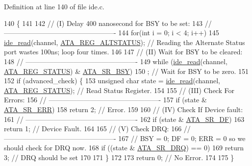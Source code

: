 Definition at line 140 of file ide.\+c.


\begin{DoxyCode}
140                                                                               \{
141     
142     \textcolor{comment}{// (I) Delay 400 nanosecond for BSY to be set:}
143     \textcolor{comment}{// -------------------------------------------------}
144     \textcolor{keywordflow}{for}(\textcolor{keywordtype}{int} i = 0; i < 4; i++)
145         \hyperlink{a00032_aef734da4bdc0c1d014528fd2f66e0686_aef734da4bdc0c1d014528fd2f66e0686}{ide\_read}(channel, \hyperlink{a00032_a051769d4520d201d24bbb06758a5c1de_a051769d4520d201d24bbb06758a5c1de}{ATA\_REG\_ALTSTATUS}); \textcolor{comment}{// Reading the Alternate Status port
       wastes 100ns; loop four times.}
146     
147     \textcolor{comment}{// (II) Wait for BSY to be cleared:}
148     \textcolor{comment}{// -------------------------------------------------}
149     \textcolor{keywordflow}{while} (\hyperlink{a00032_aef734da4bdc0c1d014528fd2f66e0686_aef734da4bdc0c1d014528fd2f66e0686}{ide\_read}(channel, \hyperlink{a00032_a3b532ef33b38be16a240f8f2e21bc5db_a3b532ef33b38be16a240f8f2e21bc5db}{ATA\_REG\_STATUS}) & \hyperlink{a00032_aed1929007f388cab23229c908be5bbaf_aed1929007f388cab23229c908be5bbaf}{ATA\_SR\_BSY})
150         ; \textcolor{comment}{// Wait for BSY to be zero.}
151     
152     \textcolor{keywordflow}{if} (advanced\_check) \{
153         \textcolor{keywordtype}{unsigned} \textcolor{keywordtype}{char} state = \hyperlink{a00032_aef734da4bdc0c1d014528fd2f66e0686_aef734da4bdc0c1d014528fd2f66e0686}{ide\_read}(channel, \hyperlink{a00032_a3b532ef33b38be16a240f8f2e21bc5db_a3b532ef33b38be16a240f8f2e21bc5db}{ATA\_REG\_STATUS}); \textcolor{comment}{// Read Status
       Register.}
154     
155         \textcolor{comment}{// (III) Check For Errors:}
156         \textcolor{comment}{// -------------------------------------------------}
157         \textcolor{keywordflow}{if} (state & \hyperlink{a00032_a8a2cf843df1ae63d4d16748dfe72a592_a8a2cf843df1ae63d4d16748dfe72a592}{ATA\_SR\_ERR})
158             \textcolor{keywordflow}{return} 2; \textcolor{comment}{// Error.}
159     
160         \textcolor{comment}{// (IV) Check If Device fault:}
161         \textcolor{comment}{// -------------------------------------------------}
162         \textcolor{keywordflow}{if} (state & \hyperlink{a00032_aca73201ed93e5c9d9d9fbf51270fde0b_aca73201ed93e5c9d9d9fbf51270fde0b}{ATA\_SR\_DF})
163             \textcolor{keywordflow}{return} 1; \textcolor{comment}{// Device Fault.}
164     
165         \textcolor{comment}{// (V) Check DRQ:}
166         \textcolor{comment}{// -------------------------------------------------}
167         \textcolor{comment}{// BSY = 0; DF = 0; ERR = 0 so we should check for DRQ now.}
168         \textcolor{keywordflow}{if} ((state & \hyperlink{a00032_a27e6aaa78aaaa205a7dadf56b48d0bf6_a27e6aaa78aaaa205a7dadf56b48d0bf6}{ATA\_SR\_DRQ}) == 0)
169             \textcolor{keywordflow}{return} 3; \textcolor{comment}{// DRQ should be set}
170     
171     \}
172     
173     \textcolor{keywordflow}{return} 0; \textcolor{comment}{// No Error.}
174     
175 \}
\end{DoxyCode}
